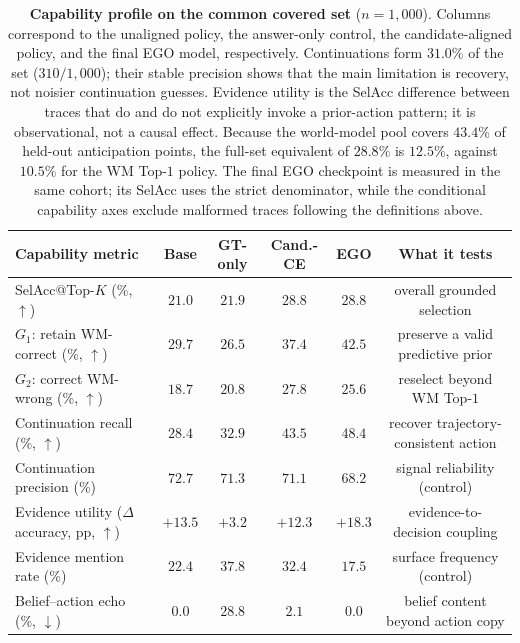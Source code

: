 \documentclass[letterpaper]{article}
\newcommand{\obs}[1]{\textcolor{measuredblue}{#1}}
\newcommand{\method}{\textsc{EGO}}
\begin{document}
\begin{table}[t]
\centering
\small
\setlength{\tabcolsep}{5pt}
\begin{tabular}{p{}ccccc}
\toprule
Capability metric & Base & GT-only & Cand.-CE & \method{} & What it tests \\
\midrule
SelAcc@Top-$K$ (\%, $\uparrow$)
  & \obs{$21.0$} & \obs{$21.9$} & \textbf{\obs{$28.8$}}
  & \textbf{\obs{$28.8$}} & overall grounded selection \\
$G_1$: retain WM-correct (\%, $\uparrow$)
  & \obs{$29.7$} & \obs{$26.5$} & \obs{$37.4$}
  & \textbf{\obs{$42.5$}} & preserve a valid predictive prior \\
$G_2$: correct WM-wrong (\%, $\uparrow$)
  & \obs{$18.7$} & \obs{$20.8$} & \textbf{\obs{$27.8$}}
  & \obs{$25.6$} & reselect beyond WM Top-\obs{$1$} \\
Continuation recall (\%, $\uparrow$)
  & \obs{$28.4$} & \obs{$32.9$} & \obs{$43.5$}
  & \textbf{\obs{$48.4$}} & recover trajectory-consistent action \\
Continuation precision (\%)
  & \obs{$72.7$} & \obs{$71.3$} & \obs{$71.1$}
  & \obs{$68.2$} & signal reliability (control) \\
Evidence utility (\(\Delta\) accuracy, pp, $\uparrow$)
  & \obs{$+13.5$} & \obs{$+3.2$} & \obs{$+12.3$}
  & \textbf{\obs{$+18.3$}} & evidence-to-decision coupling \\
Evidence mention rate (\%)
  & \obs{$22.4$} & \obs{$37.8$} & \obs{$32.4$}
  & \obs{$17.5$} & surface frequency (control) \\
Belief--action echo (\%, $\downarrow$)
  & \obs{$0.0$} & \obs{$28.8$} & \obs{$2.1$}
  & \textbf{\obs{$0.0$}} & belief content beyond action copy \\
\bottomrule
\end{tabular}
\caption{\textbf{Capability profile on the common covered set}
(\obs{$n{=}1{,}000$}).  Columns correspond to the unaligned policy, the
answer-only control, the candidate-aligned policy, and the final \method{}
model, respectively.  Continuations form
\obs{$31.0\%$} of the set
(\obs{$310/1{,}000$}); their stable precision shows that the main limitation
is recovery, not noisier continuation guesses.  Evidence utility is the
SelAcc difference between traces that do and do not explicitly invoke a
prior-action pattern; it is observational, not a causal effect.  Because the
world-model pool covers \obs{$43.4\%$} of held-out anticipation points, the
full-set equivalent of \obs{$28.8\%$} is \obs{$12.5\%$}, against
\obs{$10.5\%$} for the WM Top-\obs{$1$} policy.  The final
\method{} checkpoint is measured in the same cohort; its SelAcc uses the
strict denominator, while the conditional capability axes exclude malformed
traces following the definitions above.}
\label{tab:capability}
\end{table}
\end{document}
